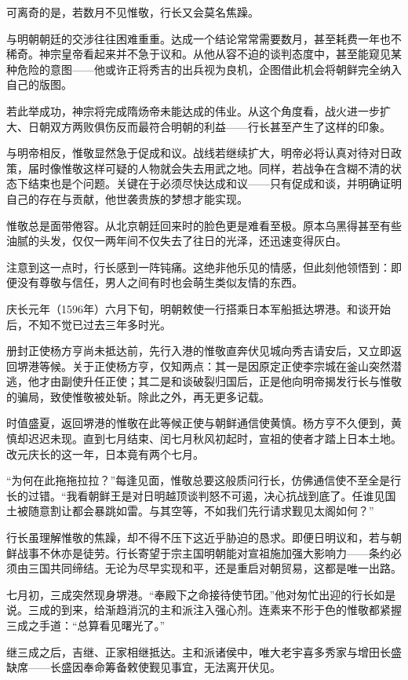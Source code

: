 \documentclass[
]{article}
\begin{document}
可离奇的是，若数月不见惟敬，行长又会莫名焦躁。

与明朝朝廷的交涉往往困难重重。达成一个结论常常需要数月，甚至耗费一年也不稀奇。神宗皇帝看起来并不急于议和。从他从容不迫的谈判态度中，甚至能窥见某种危险的意图------他或许正将秀吉的出兵视为良机，企图借此机会将朝鲜完全纳入自己的版图。

若此举成功，神宗将完成隋炀帝未能达成的伟业。从这个角度看，战火进一步扩大、日朝双方两败俱伤反而最符合明朝的利益------行长甚至产生了这样的印象。

与明帝相反，惟敬显然急于促成和议。战线若继续扩大，明帝必将认真对待对日政策，届时像惟敬这样可疑的人物就会失去用武之地。同样，若战争在含糊不清的状态下结束也是个问题。关键在于必须尽快达成和议------只有促成和谈，并明确证明自己的存在与贡献，他世袭贵族的梦想才能实现。

惟敬总是面带倦容。从北京朝廷回来时的脸色更是难看至极。原本乌黑得甚至有些油腻的头发，仅仅一两年间不仅失去了往日的光泽，还迅速变得灰白。

注意到这一点时，行长感到一阵钝痛。这绝非他乐见的情感，但此刻他领悟到：即便没有尊敬与信任，男人之间有时也会萌生类似友情的东西。

庆长元年（1596年）六月下旬，明朝敕使一行搭乘日本军船抵达堺港。和谈开始后，不知不觉已过去三年多时光。

册封正使杨方亨尚未抵达前，先行入港的惟敬直奔伏见城向秀吉请安后，又立即返回堺港等候。关于正使杨方亨，仅知两点：其一是因原定正使李宗城在釜山突然潜逃，他才由副使升任正使；其二是和谈破裂归国后，正是他向明帝揭发行长与惟敬的骗局，致使惟敬被处斩。除此之外，再无更多记载。

时值盛夏，返回堺港的惟敬在此等候正使与朝鲜通信使黄慎。杨方亨不久便到，黄慎却迟迟未现。直到七月结束、闰七月秋风初起时，宣祖的使者才踏上日本土地。改元庆长的这一年，日本竟有两个七月。

``为何在此拖拖拉拉？''每逢见面，惟敬总要这般质问行长，仿佛通信使不至全是行长的过错。``我看朝鲜王是对日明越顶谈判怒不可遏，决心抗战到底了。任谁见国土被随意割让都会暴跳如雷。与其空等，不如我们先行请求觐见太阁如何？''

行长虽理解惟敬的焦躁，却不得不压下这近乎胁迫的恳求。即便日明议和，若与朝鲜战事不休亦是徒劳。行长寄望于宗主国明朝能对宣祖施加强大影响力------条约必须由三国共同缔结。无论为尽早实现和平，还是重启对朝贸易，这都是唯一出路。

七月初，三成突然现身堺港。``奉殿下之命接待使节团。''他对匆忙出迎的行长如是说。三成的到来，给渐趋消沉的主和派注入强心剂。连素来不形于色的惟敬都紧握三成之手道：``总算看见曙光了。''

继三成之后，吉继、正家相继抵达。主和派诸侯中，唯大老宇喜多秀家与增田长盛缺席------长盛因奉命筹备敕使觐见事宜，无法离开伏见。
\end{document}
